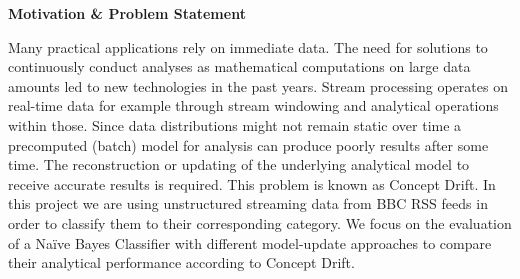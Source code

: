 \begin{center} \textbf{\huge Motivation \& Problem Statement} \end{center}
Many practical applications rely on immediate data. The need for solutions to continuously conduct analyses as mathematical computations on large data amounts led to new technologies in the past years. Stream processing operates on real-time data for example through stream windowing and analytical operations within those. Since data distributions might not remain static over time a precomputed (batch) model for analysis can produce poorly results after some time. The reconstruction or updating of the underlying analytical model to receive accurate results is required. This problem is known as Concept Drift. In this project we are using unstructured streaming data from BBC RSS feeds in order to classify them to their corresponding category. We focus on the evaluation of a Na\"ive Bayes Classifier with different model-update approaches to compare their analytical performance according to Concept Drift. 
